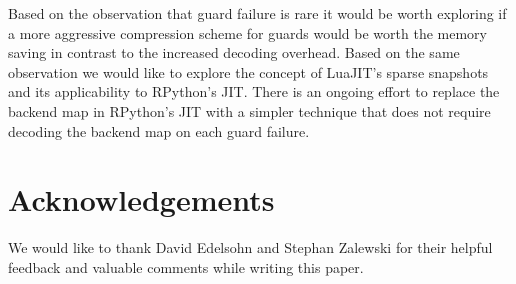 \documentclass[10pt,preprint]{sigplanconf}
\begin{document}
Based on the observation that guard failure is rare it
would be worth exploring if a more aggressive compression scheme for guards
would be worth the memory saving in contrast to the increased decoding
overhead. Based on the same observation we would like to explore the concept of
LuaJIT's sparse snapshots and its applicability to RPython's JIT.
There is an ongoing effort to replace the backend map in RPython's JIT with a
simpler technique that does not require decoding the backend map on each guard
failure.

\section*{Acknowledgements}
We would like to thank David Edelsohn and Stephan Zalewski for their helpful
feedback and valuable comments while writing this paper.

%    


\listoftodos
\end{document}
